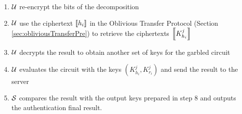 \begin{enumerate}
\item $\mathcal{U}$ re-encrypt the bits of the decomposition
\item $\mathcal{U}$ use the ciphertext $\left\llbracket h_{i}\right\rrbracket$ in the Oblivious Transfer Protocol (Section \ref{sec:obliviousTransferPre}) to retrieve the ciphertexts $\left\llbracket K_{h_{i}}^{j}\right\rrbracket$
\item $\mathcal{U}$ decrypts the result to obtain another set of keys for the garbled circuit
\item $\mathcal{U}$ evaluates the circuit with the keys $(K_{h_{i}}^{j}, K_{r_{i}}^{j})$ and send the result to the server
\item $\mathcal{S}$ compares the result with the output keys prepared in step 8 and outputs the authentication final result.
\end{enumerate}

\begin{figure}[htbp!] 
  \centering {}
\end{figure}
